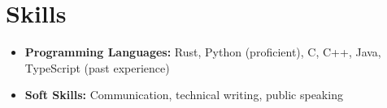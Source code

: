 \documentclass[letterpaper]{resume}
\begin{document}

    \section{Skills}
    \begin{blockquote}
        \begin{itemize}[topsep=0mm, leftmargin=4mm]
            \item \textbf{Programming Languages:} Rust, Python (proficient), C,
                  C++, Java, TypeScript (past experience) 
            \item \textbf{Soft Skills:} Communication, technical writing, public
                  speaking
        \end{itemize}
    \end{blockquote}
    \sectionrule{}
\end{document}
